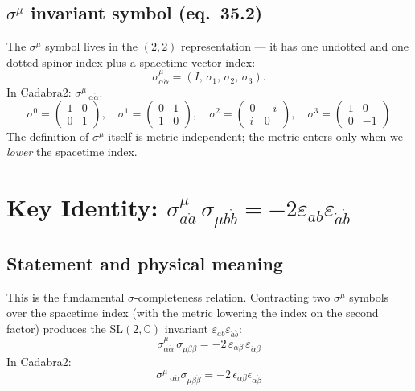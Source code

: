 \documentclass[12pt]{article}
\newcommand{\dal}{\dot\alpha}
\newcommand{\dbe}{\dot\beta}
\begin{document}
\subsection{\texorpdfstring{$\sigma^\mu$}{sigma\^{}mu} invariant symbol (eq.~35.2)}

The $\sigma^\mu$ symbol lives in the $(2,2)$ representation --- it has
one undotted and one dotted spinor index plus a spacetime vector index:
\begin{equation}
  \sigma^\mu_{\alpha\dot{\alpha}} = (I,\,\sigma_1,\,\sigma_2,\,\sigma_3).
  \tag{35.2}
\end{equation}
In Cadabra2: $\sigma^{\mu}\,_{\alpha \dal}$.
\[
  \sigma^0 = \begin{pmatrix}1 & 0 \\ 0 & 1\end{pmatrix},\quad
  \sigma^1 = \begin{pmatrix}0 & 1 \\ 1 & 0\end{pmatrix},\quad
  \sigma^2 = \begin{pmatrix}0 & -i \\ i & 0\end{pmatrix},\quad
  \sigma^3 = \begin{pmatrix}1 & 0 \\ 0 & -1\end{pmatrix}
\]
The definition of $\sigma^\mu$ itself is metric-independent; the metric
enters only when we \emph{lower} the spacetime index.

\section{Key Identity: \texorpdfstring{$\sigma^\mu_{a\dot{a}}\,\sigma_{\mu b\dot{b}}
         = -2\varepsilon_{ab}\varepsilon_{\dot{a}\dot{b}}$}{eq 35.4}
         \quad [eq.~35.4]}

\subsection{Statement and physical meaning}

This is the fundamental $\sigma$-completeness relation.  Contracting
two $\sigma^\mu$ symbols over the spacetime index (with the metric lowering
the index on the second factor) produces the
SL$(2,\mathbb{C})$ invariant $\varepsilon_{ab}\varepsilon_{\dot{a}\dot{b}}$:
\begin{equation}
  \boxed{
    \sigma^\mu_{\alpha\dot{\alpha}}\,\sigma_{\mu\beta\dot{\beta}}
    = -2\,\varepsilon_{\alpha\beta}\,\varepsilon_{\dot{\alpha}\dot{\beta}}
  }
  \tag{35.4}
\end{equation}
In Cadabra2:
\[
  \sigma^{\mu}\,_{\alpha \dal} \sigma_{\mu \beta \dbe} = -2\,\epsilon_{\alpha \beta} \epsilon_{\dal \dbe}
\]
\end{document}
